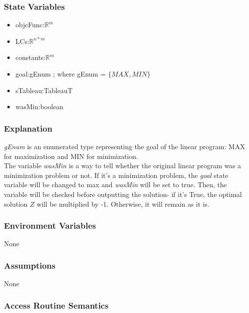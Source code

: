 \documentclass[12pt, titlepage]{article}
\begin{document}
\subsubsection{State Variables}

\begin{itemize}
	\item objcFunc:$\mathbb{R} ^m$
	\item LCs:$\mathbb{R} ^{n*m}$
	\item constants:$\mathbb{R} ^{m}$
	\item goal:gEnum ; where gEnum = $\{MAX,MIN\}$
	\item sTableau:TableauT
	\item wasMin:boolean
\end{itemize}

\subsubsection{Explanation}

\textit{gEnum} is an enumerated type representing the goal of the linear 
program: MAX for maximization and MIN for minimization. \\

The variable \textit{wasMin} is a way to tell whether the original linear 
program was a minimization problem or not. If it's a minimization problem, the 
\textit{goal} state variable will be changed to max and \textit{wasMin} will be 
set to true. Then, the variable will be checked before outputting the solution- 
if it's True, the optimal solution $Z$ will be multiplied by -1. Otherwise, it 
will remain as it is.

\subsubsection{Environment Variables}

None

\subsubsection{Assumptions}

None

\subsubsection{Access Routine Semantics}
\end{document}
